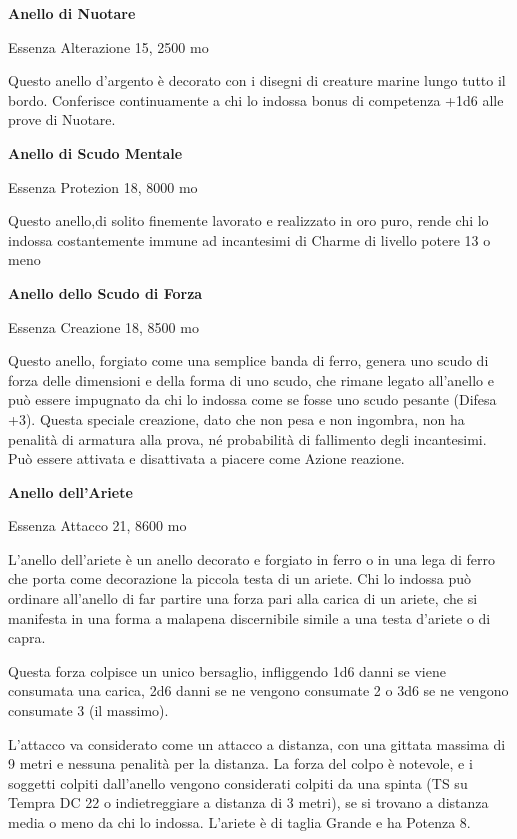 \documentclass[a4paper,11pt,twoside,openany]{book}
\begin{document}
\textbf{Anello di Nuotare}

Essenza Alterazione 15, 2500 mo

Questo anello d'argento è decorato con i disegni di creature marine lungo tutto il bordo. Conferisce continuamente a chi lo indossa bonus di competenza +1d6 alle prove di Nuotare.

\textbf{Anello di Scudo Mentale}

Essenza Protezion 18, 8000 mo

Questo anello,di solito finemente lavorato e realizzato in oro puro, rende chi lo indossa costantemente immune ad incantesimi di Charme di livello potere 13 o meno

\textbf{Anello dello Scudo di Forza}

Essenza Creazione 18, 8500 mo

Questo anello, forgiato come una semplice banda di ferro, genera uno scudo di forza delle dimensioni e della forma di uno scudo, che rimane legato all'anello e può essere impugnato da chi lo indossa come se fosse uno scudo pesante (Difesa +3). Questa speciale creazione, dato che non pesa e non ingombra, non ha penalità di armatura alla prova, né probabilità di fallimento degli incantesimi. Può essere attivata e disattivata a piacere come Azione reazione.

\textbf{Anello dell'Ariete}

Essenza Attacco 21, 8600 mo

L'anello dell'ariete è un anello decorato e forgiato in ferro o in una lega di ferro che porta come decorazione la piccola testa di un ariete. Chi lo indossa può ordinare all'anello di far partire una forza pari alla carica di un ariete, che si manifesta in una forma a malapena discernibile simile a una testa d'ariete o di capra.

Questa forza colpisce un unico bersaglio, infliggendo 1d6 danni se viene consumata una carica, 2d6 danni se ne vengono consumate 2 o 3d6 se ne vengono consumate 3 (il massimo).

L'attacco va considerato come un attacco a distanza, con una gittata massima di 9 metri e nessuna penalità per la distanza. La forza del colpo è notevole, e i soggetti colpiti dall'anello vengono considerati colpiti da una spinta (TS su Tempra DC 22 o indietreggiare a distanza di 3 metri), se si trovano a distanza media o meno da chi lo indossa. L'ariete è di taglia Grande e ha Potenza 8.
\end{document}

